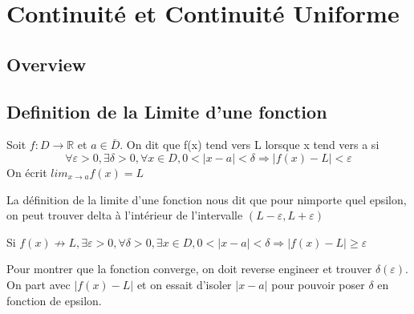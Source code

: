 \documentclass{article}
\begin{document}
\begin{problem}
\end{problem}

\pagebreak

\section{Continuité et Continuité Uniforme}

\subsection{Overview}

\subsection{Definition de la Limite d'une fonction}

\begin{definition}
\end{definition}

\begin{definition}
\end{definition}

\begin{definition}
    Soit $f:D \rightarrow \mathbb{R}$ et $a \in \bar{D}$. On dit que
    f(x) tend vers L lorsque x tend vers a si
    $$ \forall \varepsilon > 0 , \exists \delta > 0, \forall x \in D,
    0 < |x-a|< \delta \Longrightarrow |f(x) -L| < \varepsilon$$
    On écrit $lim_{x \to a} f(x) = L$
\end{definition}

\begin{remark}
    La définition de la limite d'une fonction nous dit que pour nimporte
    quel epsilon, on peut trouver delta à l'intérieur de l'intervalle
    $(L-\varepsilon, L+\varepsilon)$
\end{remark}

\begin{remark}
    Si $f(x) \not\to L, \exists \varepsilon > 0, \forall \delta > 0,
    \exists x \in D, 0 < |x-a|< \delta \Longrightarrow |f(x)-L| \geq
    \varepsilon$
\end{remark}

\begin{problem}
    Pour montrer que la fonction converge, on doit reverse engineer et
    trouver $\delta (\varepsilon)$. On part avec $|f(x)-L|$ et on essait
    d'isoler $|x-a|$ pour pouvoir poser $\delta$ en fonction de epsilon.
\end{problem}
\end{document}
